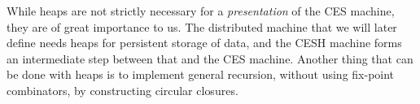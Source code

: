 \documentclass{article}
\theoremstyle{definition}
\newcommand{\Conid}[1]{\mathit{#1}}
\newcommand{\Varid}[1]{\mathit{#1}}
\def\resethooks{\global\let\SaveRestoreHook\empty
  \global\let\ColumnHook\empty}
\newlength{\blanklineskip}
\let\hspost\empty
\renewcommand\Varid[1]{\mathord{\textsf{#1}}}
\let\Conid\Varid
\newcommand\Keyword[1]{\textsf{\textbf{#1}}}
\renewcommand\Keyword[1]{\textsf{\underline{#1}}}
\renewcommand\Varid[1]{\textsf{#1}}
\begin{document}
While heaps are not strictly necessary for a \emph{presentation} of
the CES machine, they are of great importance to us. The distributed
machine that we will later define needs heaps for persistent
storage of data, and the CESH machine forms an intermediate step
between that and the CES machine.
\iffullversion
Another thing that can be done with
heaps is to implement general recursion, without using fix-point
combinators, by constructing circular closures.
\fi

\begin{comment}
\begin{hscode}\SaveRestoreHook
\column{B}{@{}>{\hspre}l<{\hspost}@{}}\column{E}{@{}>{\hspre}l<{\hspost}@{}}\>[B]{}\Keyword{module}\;\Conid{CESH}\;(\Conid{Node}\;\mathbin{:}\;\star)\;\Keyword{where}{}\<[E]\\[\blanklineskip]\>[B]{}\Keyword{open}\;\Keyword{import}\;\Conid{GeneralLemmas}{}\<[E]\\[\blanklineskip]\>[B]{}\Keyword{open}\;\Keyword{import}\;\Conid{Heap}{}\<[E]\\
\>[B]{}\Keyword{open}\;\Keyword{import}\;\Conid{MachineCode}\;\Conid{Node}{}\<[E]\\
\>[B]{}\Keyword{open}\;\Keyword{import}\;\Conid{Relation}{}\<[E]\ColumnHook
\end{hscode}\resethooks
\end{comment}
\end{document}
